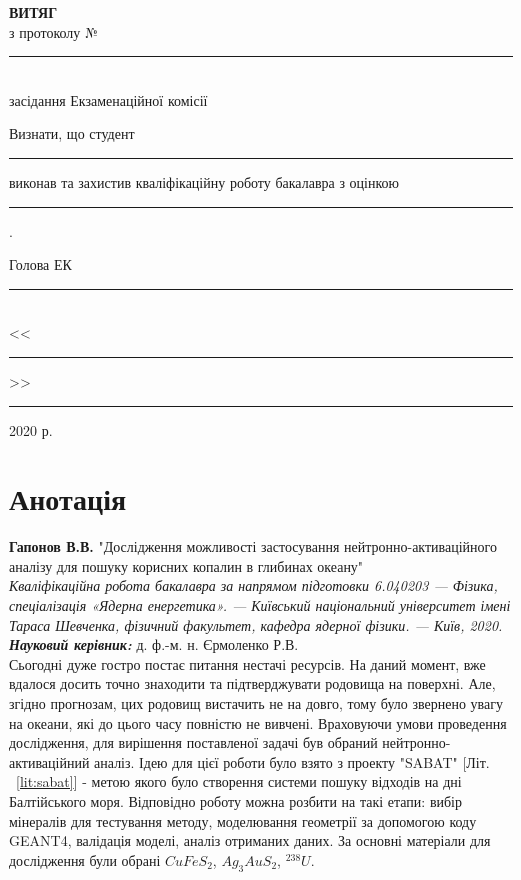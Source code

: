 \documentclass[a4paper, 14pt]{article}
\numberwithin{equation}{section}
\numberwithin{table}{section}
\begin{document}
\begin{titlepage}
	\renewcommand{\baselinestretch}{1.0}
	\newcommand{\ul}[1]{\rule{#1}{0.1pt}}
	\begin{spacing}{1.8}
		\vspace*{4.5cm}
		{\center
			{\bf ВИТЯГ}\\
			з протоколу № \ul{2.4cm}\\
			засідання Екзаменаційної комісії\\[2cm]}
		{\noindent
			Визнати, що студент \ul{7.2cm} виконав та захистив кваліфікаційну роботу бакалавра з оцінкою \ul{7.2cm} .\\[1cm]}
		{\flushright
			Голова ЕК \ul{7.8cm}\\
			<<\ul{1cm}>> \ul{4cm} 2020 р.\\}
	\end{spacing}
\end{titlepage}


\pagestyle{empty}
\section*{Анотація}

{\bf Гапонов В.В.} "Дослідження можливості застосування нейтронно-активаційного аналізу для пошуку корисних копалин в глибинах океану"\\
{\itshape Кваліфікаційна робота бакалавра за напрямом підготовки 6.040203 --- Фізика, спеціалізація «Ядерна енергетика». --- Київський національний університет імені Тараса Шевченка, фізичний факультет, кафедра ядерної фізики. --- Київ, 2020.} \\
{\itshape \bfseries Науковий керівник:} д. ф.-м. н. Єрмоленко Р.В.%
\\[0.5cm]
Сьогодні дуже гостро постає питання нестачі ресурсів. На даний момент, вже вдалося досить точно знаходити та підтверджувати родовища на поверхні. Але, згідно прогнозам, цих родовищ вистачить не на довго, тому було звернено увагу на океани, які до цього часу повністю не вивчені. 
Враховуючи умови проведення дослідження, для вирішення поставленої задачі був обраний нейтронно-активаційний аналіз. Ідею для цієї роботи було взято з проекту "SABAT" [Літ. ~\ref{lit:sabat}] - метою якого було створення системи пошуку відходів на дні Балтійського моря. Відповідно роботу можна розбити на такі етапи: вибір мінералів для тестування методу, моделювання геометрії за допомогою коду GEANT4, валідація моделі, аналіз отриманих даних. За основні матеріали для дослідження були обрані $CuFeS_2$, $Ag_3AuS_2$, $^{238}U$. 
\end{document}
